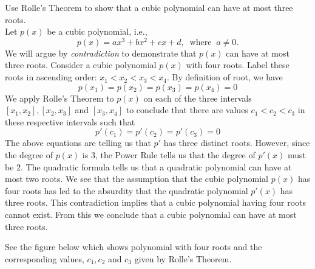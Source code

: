 \documentclass[handout]{ximera}
\begin{document}
\begin{example}[example 2] Use Rolle's Theorem  to show that a cubic polynomial can have at most three roots.\\



Let $p(x)$ be a cubic polynomial, i.e., 
\[
p(x) = ax^3 + bx^2 + cx + d, \;\; \text{where} \;\; a\neq 0.
\]
We will argue by {\it contradiction} to demonstrate that $p(x)$ can have at most three roots.
Consider a cubic polynomial $p(x)$ with four roots.
Label these roots in ascending order: $x_1 <  x_2 < x_3 < x_4$.
By definition of root, we have
\[
p(x_1) = p(x_2) = p(x_3) = p(x_4) = 0
\]
We apply Rolle's Theorem to $p(x)$ on each of the three intervals $[x_1, x_2], [x_2, x_3]$ and $[x_3, x_4]$ to conclude that 
there are values $c_1 < c_2 < c_3$ in these respective intervals such that
\[
p'(c_1) = p'(c_2) = p'(c_3) = 0
\]
The above equations are telling us that $p'$ has three distinct roots.
However, since the degree of $p(x)$ is $3$, the Power Rule tells us that the degree of $p'(x)$ must be $2$.
The quadratic formula tells us that a quadratic polynomial can have at most two roots.
We see that the assumption that the cubic polynomial $p(x)$ has four roots has led to the absurdity that 
the quadratic polynomial $p'(x)$ has three roots.
This contradiction implies that a cubic polynomial having four roots cannot exist.
From this we conclude that a cubic polynomial can have at most three roots.

See the figure below which shows polynomial with four roots and the corresponding values, $c_1, c_2$ and $c_3$ given by Rolle's Theorem.

\begin{image}
\end{image}

\end{example}
\end{document}
